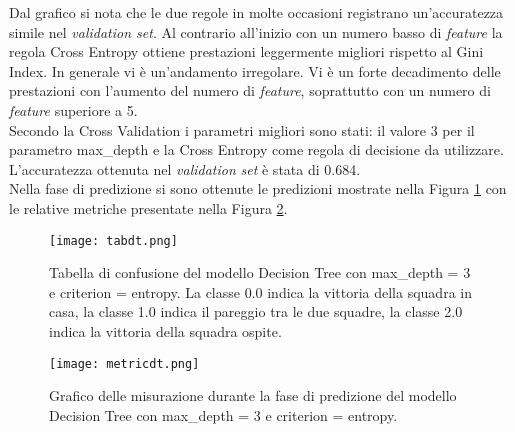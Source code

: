 Dal grafico si nota che le due regole in molte occasioni registrano un'accuratezza simile nel \emph{validation set}. Al contrario all'inizio con un numero basso di \emph{feature} la regola Cross Entropy ottiene prestazioni leggermente migliori rispetto al Gini Index. In generale vi è un'andamento irregolare. Vi è un forte decadimento delle prestazioni con l'aumento del numero di \emph{feature}, soprattutto con un numero di \emph{feature} superiore a 5.\\
Secondo la Cross Validation i parametri migliori sono stati: il valore 3 per il parametro max\_depth e la Cross Entropy come regola di decisione da utilizzare. L'accuratezza ottenuta nel \emph{validation} \emph{set} è stata di 0.684.\\
Nella fase di predizione si sono ottenute le predizioni mostrate nella Figura \ref{fig:tabdt} con le relative metriche presentate nella Figura \ref{fig:dtmetrics}.
\begin{figure}[h]
	\begin{center}
		\texttt{[image: tabdt.png]}
		\caption{Tabella di confusione del modello Decision Tree con max\_depth = 3 e criterion = entropy. La classe 0.0 indica la vittoria della squadra in casa, la classe 1.0 indica il pareggio tra le due squadre, la classe 2.0 indica la vittoria della squadra ospite.
		} 
		\label{fig:tabdt}
	\end{center}
\end{figure}

\begin{figure}[]
	\begin{center}
		\texttt{[image: metricdt.png]}
		\caption{Grafico delle misurazione durante la fase di predizione del modello Decision Tree con max\_depth = 3 e criterion = entropy.
		} 
		\label{fig:dtmetrics}
	\end{center}
\end{figure}

